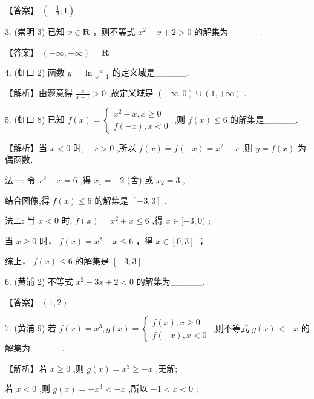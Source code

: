 \documentclass[10pt]{article}
\begin{document}
【答案】 \(\left( {-\frac{1}{2},1}\right)\)

3. (崇明 3) 已知 \(x \in  \mathbf{R}\) ，则不等式 \({x}^{2} - x + 2 > 0\) 的解集为\_\_\_\_\_.

【答案】 \(\left( {-\infty , + \infty }\right)  = \mathbf{R}\)

4. (虹口 2) 函数 \(y = \ln \frac{x}{x - 1}\) 的定义域是\_\_\_\_\_.

【解析】由题意得 \(\frac{x}{x - 1} > 0\) ,故定义域是 \(\left( {-\infty ,0}\right)  \cup  \left( {1, + \infty }\right)\) .

5. (虹口 8) 已知 \(f\left( x\right)  = \left\{  \begin{array}{l} {x}^{2} - x,x \geq  0 \\  f\left( {-x}\right) ,x < 0 \end{array}\right.\) ,则 \(f\left( x\right)  \leq  6\) 的解集是\_\_\_\_\_.

【解析】当 \(x < 0\) 时, \(- x > 0\) ,所以 \(f\left( x\right)  = f\left( {-x}\right)  = {x}^{2} + x\) ,则 \(y = f\left( x\right)\) 为偶函数,

法一: 令 \({x}^{2} - x = 6\) ,得 \({x}_{1} =  - 2\) (舍) 或 \({x}_{2} = 3\) ,

结合图像,得 \(f\left( x\right)  \leq  6\) 的解集是 \(\left\lbrack  {-3,3}\right\rbrack\) .

法二: 当 \(x < 0\) 时, \(f\left( x\right)  = {x}^{2} + x \leq  6\) ,得 \(x \in  \lbrack  - 3,0)\) ;

当 \(x \geq  0\) 时， \(f\left( x\right)  = {x}^{2} - x \leq  6\) ，得 \(x \in  \left\lbrack  {0,3}\right\rbrack\) ；

综上， \(f\left( x\right)  \leq  6\) 的解集是 \(\left\lbrack  {-3,3}\right\rbrack\) .

6. (黄浦 2) 不等式 \({x}^{2} - {3x} + 2 < 0\) 的解集为\_\_\_\_\_.

【答案】 \(\left( {1,2}\right)\)

7. (黄浦 9) 若 \(f\left( x\right)  = {x}^{3},g\left( x\right)  = \left\{  \begin{array}{l} f\left( x\right) ,x \geq  0 \\  f\left( {-x}\right) ,x < 0 \end{array}\right.\) ,则不等式 \(g\left( x\right)  <  - x\) 的解集为\_\_\_\_\_.

【解析】若 \(x \geq  0\) ,则 \(g\left( x\right)  = {x}^{3} \geq   - x\) ,无解;

若 \(x < 0\) ,则 \(g\left( x\right)  =  - {x}^{3} <  - x\) ,所以 \(- 1 < x < 0\) ;
\end{document}
